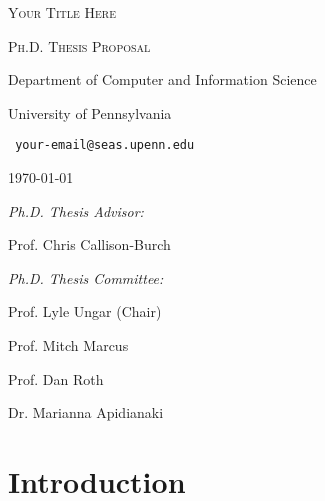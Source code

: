 \documentclass[12pt]{article}
\begin{document}
\newcommand{\mainfile}{}
 
\begin{titlepage}

{\centering \scshape\LARGE {\color{red} Your Title Here} \par}
{\centering \scshape\large Ph.D. Thesis Proposal \par}

\vspace{1cm}

{ \par}
{\centering  Department of Computer and Information Science \par}
{\centering  University of Pennsylvania \par}
{\centering  \texttt{\color{red} your-email@seas.upenn.edu} \par}

\vspace{12pt}
{\centering \large \today \par}

\vspace{1cm}

\textit{Ph.D. Thesis Advisor:}

{\color{red} Prof. Chris Callison-Burch}

\vspace{12pt}
\textit{Ph.D. Thesis Committee:}

{\color{red} Prof. Lyle Ungar (Chair)}

{\color{red} Prof. Mitch Marcus}

{\color{red} Prof. Dan Roth}

{\color{red} Dr. Marianna Apidianaki}


\end{titlepage}



\pagebreak

\tableofcontents

\pagebreak

\section{Introduction} %
\label{sec:introduction}


\pagebreak
\end{document}
